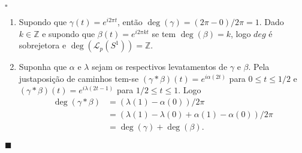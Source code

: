 \documentclass[12pt]{book}
\newenvironment{prova}[1]{$\square$ #1}{\hfill$\blacksquare$}
\newcommand{\caminhos}{\mathcal{L}}
\newcommand{\caminhospontobasegeral}[2]{\caminhos_{#1}(#2)}
\newcommand{\circulo}{S^{1}}
\newcommand{\inteiros}{\mathbb{Z}}
\begin{document}
	\begin{prova}
		\begin{enumerate}
			\item Supondo que $\gamma(t) = e^{i2\pi t}$, então $\deg(\gamma) = (2\pi -0)/2\pi =1$. Dado $k \in \inteiros$ e supondo que $\beta(t) = e^{i2\pi kt}$ se tem $\deg(\beta) = k$, logo $deg$ é sobrejetora e $\deg(\caminhospontobasegeral{p}{\circulo}) = \inteiros$.
			
			\item Suponha que $\alpha$ e $\lambda$ sejam os respectivos levatamentos de $\gamma$ e $\beta$. Pela justaposição de caminhos tem-se $(\gamma*\beta)(t) = e^{i\alpha(2t)}$ para $0\leq t\leq 1/2$ e  $(\gamma*\beta)(t) = e^{i\lambda(2t - 1)}$ para $1/2\leq t\leq 1$. Logo 
			$$
			\begin{aligned}
			\deg(\gamma*\beta) &= (\lambda(1)- \alpha(0))/2\pi 
			\\
			&= (\lambda(1) -\lambda(0)+ \alpha(1)- \alpha(0))/2\pi
			\\
			&= \deg(\gamma)+\deg(\beta).
			\end{aligned}
			$$  
						

\end{enumerate}
\end{prova}
\end{document}
